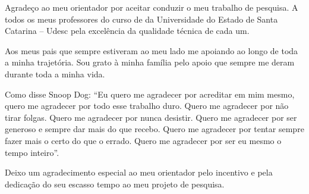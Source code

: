 \begin{agradecimentos}
Agradeço ao meu orientador por aceitar conduzir o meu trabalho de pesquisa.
A todos os meus professores do curso de da Universidade do Estado de Santa Catarina – Udesc pela excelência da qualidade técnica de cada um.

Aos meus pais que sempre estiveram ao meu lado me apoiando ao longo de toda a minha trajetória. Sou grato à minha família pelo apoio que sempre me deram durante toda a minha vida.

Como disse Snoop Dog: ``Eu quero me agradecer por acreditar em mim mesmo, quero me agradecer por todo esse trabalho duro. Quero me agradecer por não tirar folgas. Quero me agradecer por nunca desistir. Quero me agradecer por ser generoso e sempre dar mais do que recebo. Quero me agradecer por tentar sempre fazer mais o certo do que o errado. Quero me agradecer por ser eu mesmo o tempo inteiro''.

Deixo um agradecimento especial ao meu orientador pelo incentivo e pela dedicação do seu escasso tempo ao meu projeto de pesquisa.


\end{agradecimentos}
